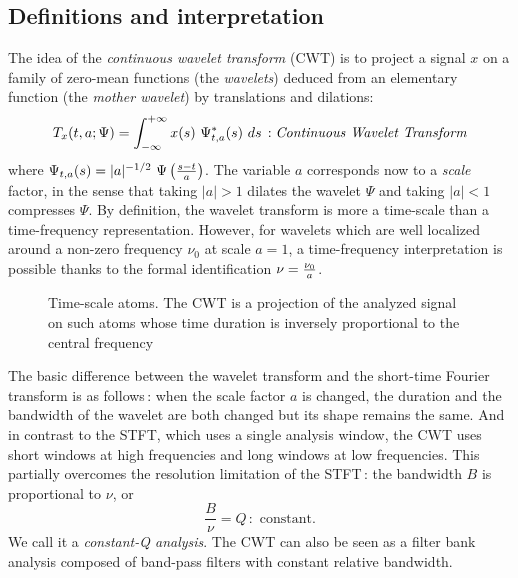 \subsection{Definitions and interpretation}
\label{CWT}
  The idea of the {\it
continuous wavelet transform} (CWT) is to project a signal $x$ on a family
of zero-mean functions (the {\it wavelets}) deduced from an elementary
function (the {\it mother wavelet}) by translations and dilations:
\[T_x(t,a;\Psi)=\int_{-\infty}^{+\infty} x(s)\ \Psi^*_{t,a}(s)\ ds\,:
\mbox{\it Continuous Wavelet Transform}\] where $\Psi_{t,a}(s)=|a|^{-1/2}\
\Psi\left({s-t\over a}\right)$.  The variable $a$
corresponds now to a {\it scale} factor, in the sense that taking $|a|>1$
dilates the wavelet $\Psi$ and taking $|a|<1$ compresses $\Psi$. By
definition, the wavelet transform is more a time-scale than a
time-frequency representation. However, for wavelets which are
well localized around a non-zero frequency $\nu_0$ at scale $a = 1$, a
time-frequency interpretation is possible thanks to the formal
identification $\nu={\nu_0\over a}$.
\begin{figure}[htb]
\epsfxsize=10cm
\epsfysize=6cm
\centerline{}
\caption{\label{At2fig1}Time-scale atoms. The CWT is a projection of the
analyzed signal on such atoms whose time duration is inversely proportional
to the central frequency}
\end{figure}

\label{Qana}
  The basic difference between the wavelet transform and the short-time
Fourier transform is as follows\,: when the scale factor $a$ is changed, the
duration and the bandwidth of the wavelet are both changed but its shape
remains the same. And in contrast to the STFT, which uses a single analysis
window, the CWT uses short windows at high frequencies and long windows at
low frequencies. This partially overcomes the resolution limitation of the
STFT\,: the bandwidth $B$ is proportional to $\nu$, or
\[\frac{B}{\nu}=Q\,: \mbox{ constant}.\]
We call it a {\it constant-Q analysis}. The CWT can also be seen as a filter
bank analysis composed of band-pass filters with constant relative
bandwidth.


